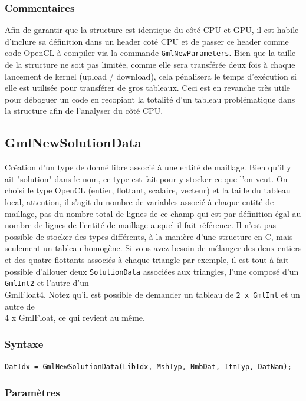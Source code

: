 \documentclass[a4paper,12pt]{article}
\begin{document}
\subsubsection*{Commentaires}
Afin de garantir que la structure est identique du côté CPU et GPU, il est habile d'inclure sa définition dans un header coté CPU et de passer ce header comme code OpenCL à compiler via la commande {\tt GmlNewParameters}.
Bien que la taille de la structure ne soit pas limitée, comme elle sera transférée deux fois à chaque lancement de kernel (upload / download), cela pénalisera le temps d'exécution si elle est utilisée pour transférer de gros tableaux.
Ceci est en revanche très utile pour déboguer un code en recopiant la totalité d'un tableau problématique dans la structure afin de l'analyser du côté CPU.


\subsection{GmlNewSolutionData}

Création d'un type de donné libre associé à une entité de maillage.
Bien qu'il y ait "solution" dans le nom, ce type est fait pour y stocker ce que l'on veut.
On choisi le type OpenCL (entier, flottant, scalaire, vecteur) et la taille du tableau local, attention, il s'agit du nombre de variables associé à chaque entité de maillage, pas du nombre total de lignes de ce champ qui est par définition égal au nombre de lignes de l'entité de maillage auquel il fait référence.
Il n'est pas possible de stocker des types différents, à la manière d'une structure en C, mais seulement un tableau homogène. Si vous avez besoin de mélanger des deux entiers et des quatre flottants associés à chaque triangle par exemple, il est tout à fait possible d'allouer deux {\tt SolutionData} associées aux triangles, l'une composé d'un {\tt GmlInt2} et l'autre d'un {\\ GmlFloat4}. Notez qu'il est possible de demander un tableau de {\tt 2 x GmlInt} et un autre de {\\ 4 x GmlFloat}, ce qui revient au même.

\subsubsection*{Syntaxe}

{\tt DatIdx = GmlNewSolutionData(LibIdx, MshTyp, NmbDat, ItmTyp, DatNam);}

\subsubsection*{Paramètres}
\end{document}
